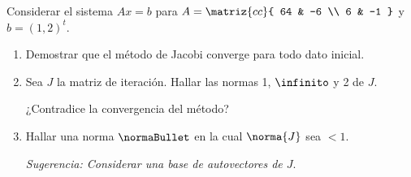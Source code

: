 \begin{enunciado}{\ejercicio}
  Considerar el sistema $Ax = b$ para
  $
    A = \matriz{cc}{
      64 & -6 \\
      6 & -1
    }
  $ y $b = (1,2)^t$.
  \begin{enumerate}[label=(\alph*)]
    \item Demostrar que el método de Jacobi converge para todo dato inicial.

    \item Sea $J$ la matriz de iteración. Hallar las normas 1, $\infinito$ y 2 de $J$.

          ¿Contradice la convergencia del método?

    \item Hallar una norma $\normaBullet$ en la cual $\norma{J}$ sea $<1$.

          \textit{Sugerencia: Considerar una base de autovectores de $J$}.
  \end{enumerate}
\end{enunciado}

